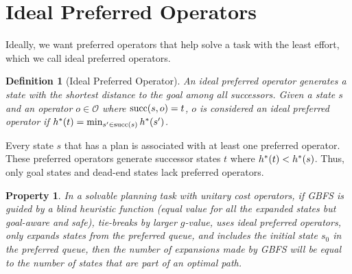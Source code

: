 \documentclass[ppgc,diss,english]{iiufrgs}
\newtheorem{definition}{Definition}
\newtheorem{property}{Property}
\begin{document}
\section{Ideal Preferred Operators}
\label{sec:sample-ideal-po}
Ideally, we want preferred operators that help solve a task with the least effort, which we call ideal preferred operators.

\begin{definition}[Ideal Preferred Operator]\label{def:ideal_preferred_operator}
An ideal preferred operator generates a state with the shortest distance to the goal among all successors. Given a state $s$ and an operator $o \in \mathcal{O}$ where $\operatorname{succ}(s,o) = t$, $o$ is considered an ideal preferred operator if $h^*({t}) = \min_{s' \in \operatorname{succ}(s)} h^*({s'})$.
\end{definition}

Every state $s$ that has a plan is associated with at least one preferred operator. These preferred operators generate successor states $t$ where $h^*({t}) < h^*({s})$. Thus, only goal states and dead-end states lack preferred operators.

\begin{property}
\label{prop:ideal-optimal}
In a solvable planning task with unitary cost operators, if GBFS is guided by a blind heuristic function (equal value for all the expanded states but goal-aware and safe), tie-breaks by larger $g$-value, uses ideal preferred operators, only expands states from the preferred queue, and includes the initial state $s_{0}$ in the preferred queue, then the number of expansions made by GBFS will be equal to the number of states that are part of an optimal path.
\end{property}
\end{document}
